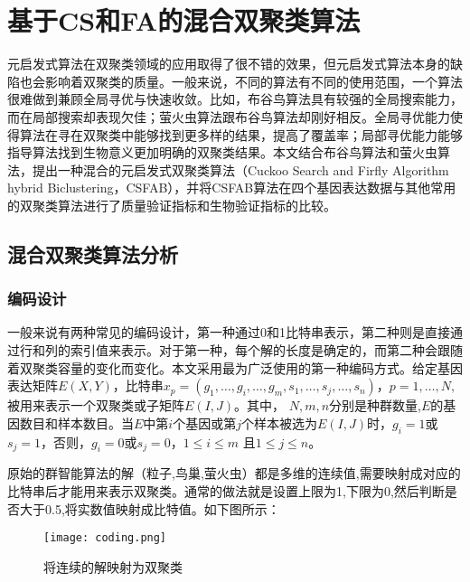 \chapter{基于CS和FA的混合双聚类算法}
元启发式算法在双聚类领域的应用取得了很不错的效果，但元启发式算法本身的缺陷也会影响着双聚类的质量。一般来说，不同的算法有不同的使用范围，一个算法很难做到兼顾全局寻优与快速收敛。比如，布谷鸟算法具有较强的全局搜索能力，而在局部搜索却表现欠佳；萤火虫算法跟布谷鸟算法却刚好相反。全局寻优能力使得算法在寻在双聚类中能够找到更多样的结果，提高了覆盖率；局部寻优能力能够指导算法找到生物意义更加明确的双聚类结果。本文结合布谷鸟算法和萤火虫算法，提出一种混合的元启发式双聚类算法（Cuckoo Search and Firfly Algorithm hybrid Biclustering，CSFAB），并将CSFAB算法在四个基因表达数据与其他常用的双聚类算法进行了质量验证指标和生物验证指标的比较。

\section{混合双聚类算法分析}
    \subsection{编码设计}
    一般来说有两种常见的编码设计，第一种通过0和1比特串表示，第二种则是直接通过行和列的索引值来表示。对于第一种，每个解的长度是确定的，而第二种会跟随着双聚类容量的变化而变化。本文采用最为广泛使用的第一种编码方式。给定基因表达矩阵$E(X,Y)$，比特串$x_p = (g_1,\dots,g_i,\dots,g_m,s_1,\dots,s_j,\dots,s_n)$，$ p=1,\dots,N, $ 被用来表示一个双聚类或子矩阵$E(I,J)$。其中， $N,m,n$分别是种群数量,$E$的基因数目和样本数目。当$E$中第$i$个基因或第$j$个样本被选为$E(I,J)$时，$g_i=1$或$s_j=1$，否则，$g_i=0$或$s_j=0$，$1\le i \le m$ 且$1\le j \le n$。

    原始的群智能算法的解（粒子,鸟巢,萤火虫）都是多维的连续值,需要映射成对应的比特串后才能用来表示双聚类。通常的做法就是设置上限为1,下限为0,然后判断是否大于0.5,将实数值映射成比特值。如下图所示：
    \begin{figure}[htbp]
        \centering
        \texttt{[image: coding.png]}
        \caption{将连续的解映射为双聚类}
        \label{fig:encoding}
    \end{figure}

